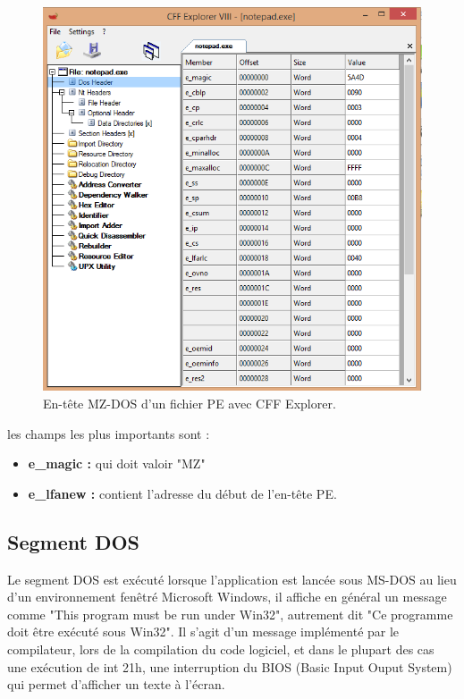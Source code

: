 \begin{figure}[H]
\begin{center}
\includegraphics[scale=0.7]{Figures/pic1.PNG}
\caption{ En-tête MZ-DOS d'un fichier PE avec CFF Explorer.}
\label{fig :pic1} 
\end{center}
\end{figure}
les champs les plus importants sont :
\begin{itemize}
\item \textbf{e\_magic : }qui doit valoir "MZ"
\item \textbf{e\_lfanew : }contient l'adresse du début de l'en-tête PE.
\end{itemize}
\subsection{Segment DOS}
Le segment DOS est exécuté lorsque l'application est lancée sous MS-DOS au lieu d'un environnement fenêtré Microsoft Windows, il affiche en général un message comme "This program must be run under Win32", autrement dit "Ce programme doit être exécuté sous Win32". Il s'agit d'un message implémenté par le compilateur, lors de la compilation du code logiciel, et dans le plupart des cas une exécution de int 21h, une interruption du BIOS (Basic Input Ouput System) qui permet d'afficher un texte à l'écran.\\


